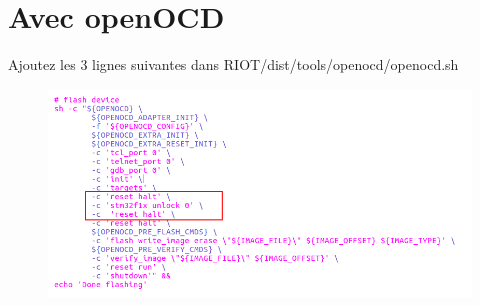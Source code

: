 \documentclass{article}
\begin{document}
\section{Avec openOCD}
Ajoutez les 3 lignes suivantes dans RIOT/dist/tools/openocd/openocd.sh 

\begin{figure}[H]
\begin{center}
\advance\leftskip-3cm
\advance\rightskip-3cm
\includegraphics[keepaspectratio=true,scale=0.4]{openocddotsh.png}
\label{visina8}
\end{center}\end{figure}
\end{document}

